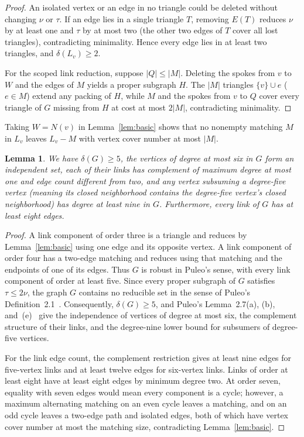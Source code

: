 \documentclass[11pt]{article}
\newtheorem{lemma}[theorem]{Lemma}
\begin{document}
\begin{proof}
An isolated vertex or an edge in no triangle could be deleted without changing $\nu$ or $\tau$. If an edge lies in a single triangle $T$, removing $E(T)$ reduces $\nu$ by at least one and $\tau$ by at most two (the other two edges of $T$ cover all lost triangles), contradicting minimality. Hence every edge lies in at least two triangles, and $\delta(L_v)\geq 2$.

For the scoped link reduction, suppose $|Q|\leq |M|$. Deleting the spokes from $v$ to $W$ and the edges of $M$ yields a proper subgraph $H$. The $|M|$ triangles $\{v\}\cup e$ ($e\in M$) extend any packing of $H$, while $M$ and the spokes from $v$ to $Q$ cover every triangle of $G$ missing from $H$ at cost at most $2|M|$, contradicting minimality.
\end{proof}

Taking $W=N(v)$ in Lemma~\ref{lem:basic} shows that no nonempty matching $M$ in $L_v$ leaves $L_v-M$ with vertex cover number at most $|M|$.

\begin{lemma}\label{lem:puleo}
We have $\delta(G)\geq 5$, the vertices of degree at most six in $G$ form an independent set, each of their links has complement of maximum degree at most one and edge count different from two, and any vertex subsuming a degree-five vertex (meaning its closed neighborhood contains the degree-five vertex's closed neighborhood) has degree at least nine in $G$. Furthermore, every link of $G$ has at least eight edges.
\end{lemma}

\begin{proof}
A link component of order three is a triangle and reduces by Lemma~\ref{lem:basic} using one edge and its opposite vertex. A link component of order four has a two-edge matching and reduces using that matching and the endpoints of one of its edges. Thus $G$ is robust in Puleo's sense, with every link component of order at least five. Since every proper subgraph of $G$ satisfies $\tau\leq 2\nu$, the graph $G$ contains no reducible set in the sense of Puleo's Definition~2.1~\cite{Puleo}. Consequently, $\delta(G)\geq 5$, and Puleo's Lemma~2.7(a), (b), and~(e)~\cite{Puleo} give the independence of vertices of degree at most six, the complement structure of their links, and the degree-nine lower bound for subsumers of degree-five vertices.

For the link edge count, the complement restriction gives at least nine edges for five-vertex links and at least twelve edges for six-vertex links. Links of order at least eight have at least eight edges by minimum degree two. At order seven, equality with seven edges would mean every component is a cycle; however, a maximum alternating matching on an even cycle leaves a matching, and on an odd cycle leaves a two-edge path and isolated edges, both of which have vertex cover number at most the matching size, contradicting Lemma~\ref{lem:basic}.
\end{proof}
\end{document}
